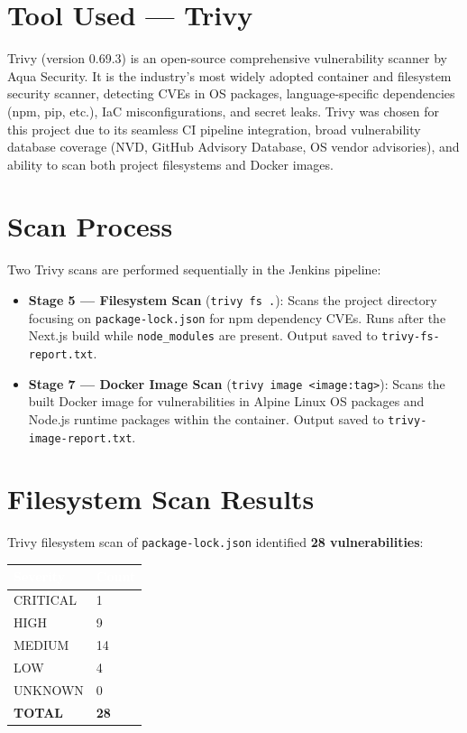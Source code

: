\documentclass[12pt,a4paper,oneside]{report}
\begin{document}
\section{Tool Used --- Trivy}

Trivy (version 0.69.3) is an open-source comprehensive vulnerability scanner by
Aqua Security. It is the industry's most widely adopted container and filesystem
security scanner, detecting CVEs in OS packages, language-specific dependencies
(npm, pip, etc.), IaC misconfigurations, and secret leaks. Trivy was chosen for
this project due to its seamless CI pipeline integration, broad vulnerability
database coverage (NVD, GitHub Advisory Database, OS vendor advisories), and
ability to scan both project filesystems and Docker images.

\section{Scan Process}

Two Trivy scans are performed sequentially in the Jenkins pipeline:

\begin{itemize}
  \item \textbf{Stage 5 --- Filesystem Scan} (\texttt{trivy fs .}): Scans the
        project directory focusing on \texttt{package-lock.json} for npm dependency
        CVEs. Runs after the Next.js build while \texttt{node\_modules} are present.
        Output saved to \texttt{trivy-fs-report.txt}.
  \item \textbf{Stage 7 --- Docker Image Scan} (\texttt{trivy image <image:tag>}):
        Scans the built Docker image for vulnerabilities in Alpine Linux OS packages
        and Node.js runtime packages within the container. Output saved to
        \texttt{trivy-image-report.txt}.
\end{itemize}

\section{Filesystem Scan Results}

Trivy filesystem scan of \texttt{package-lock.json} identified \textbf{28
vulnerabilities}:

\vspace{6pt}
\begin{center}
\begin{tabular}{|C{0.3\textwidth}|C{0.25\textwidth}|}
\hline
{}
\textcolor{white}{\textbf{Severity}} &
\textcolor{white}{\textbf{Count}} \\
\hline
CRITICAL & 1 \\
HIGH     & 9 \\
MEDIUM   & 14 \\
LOW      & 4 \\
UNKNOWN  & 0 \\
\textbf{TOTAL} & \textbf{28} \\
\hline
\end{tabular}
\end{center}
\vspace{6pt}
\end{document}
